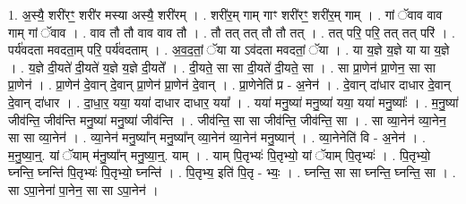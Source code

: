 \documentclass[17pt]{extarticle}
\begin{document}
1. अ॒स्यै॒ शरी॑रꣳ॒॒ शरी॑र मस्या अस्यै॒ शरी॑रम् । . शरी॑र॒म् गाम् गाꣳ शरी॑रꣳ॒॒ शरी॑र॒म् गाम् । . गां ॅवाव वाव गाम् गां ॅवाव । . वाव तौ तौ वाव वाव तौ । . तौ तत् तत् तौ तौ तत् । . तत् परि॒ परि॒ तत् तत् परि॑ । . पर्य॑वदता मवदता॒म् परि॒ पर्य॑वदताम् । . अ॒व॒द॒तां॒ ॅया या ऽव॑दता मवदतां॒ ॅया । . या य॒ज्ञे य॒ज्ञे या या य॒ज्ञे । . य॒ज्ञे दी॒यते॑ दी॒यते॑ य॒ज्ञे य॒ज्ञे दी॒यते᳚ । . दी॒यते॒ सा सा दी॒यते॑ दी॒यते॒ सा । . सा प्रा॒णेन॑ प्रा॒णेन॒ सा सा प्रा॒णेन॑ । . प्रा॒णेन॑ दे॒वान् दे॒वान् प्रा॒णेन॑ प्रा॒णेन॑ दे॒वान् । . प्रा॒णेनेति॑ प्र - अ॒नेन॑ । . दे॒वान् दा॑धार दाधार दे॒वान् दे॒वान् दा॑धार । . दा॒धा॒र॒ यया॒ यया॑ दाधार दाधार॒ यया᳚ । . यया॑ मनु॒ष्या॑ मनु॒ष्या॑ यया॒ यया॑ मनु॒ष्याः᳚ । . म॒नु॒ष्या॑ जीव॑न्ति॒ जीव॑न्ति मनु॒ष्या॑ मनु॒ष्या॑ जीव॑न्ति । . जीव॑न्ति॒ सा सा जीव॑न्ति॒ जीव॑न्ति॒ सा । . सा व्या॒नेन॑ व्या॒नेन॒ सा सा व्या॒नेन॑ । . व्या॒नेन॑ मनु॒ष्या᳚न् मनु॒ष्या᳚न् व्या॒नेन॑ व्या॒नेन॑ मनु॒ष्यान्॑ । . व्या॒नेनेति॑ वि - अ॒नेन॑ । . म॒नु॒ष्या॒न्॒. यां ॅयाम् म॑नु॒ष्या᳚न् मनु॒ष्या॒न्॒. याम् । . याम् पि॒तृभ्यः॑ पि॒तृभ्यो॒ यां ॅयाम् पि॒तृभ्यः॑ । . पि॒तृभ्यो॒ घ्नन्ति॒ घ्नन्ति॑ पि॒तृभ्यः॑ पि॒तृभ्यो॒ घ्नन्ति॑ । . पि॒तृभ्य॒ इति॑ पि॒तृ - भ्यः॒ । . घ्नन्ति॒ सा सा घ्नन्ति॒ घ्नन्ति॒ सा । . सा ऽपा॒नेना॑ पा॒नेन॒ सा सा ऽपा॒नेन॑ । \newline
\end{document}
